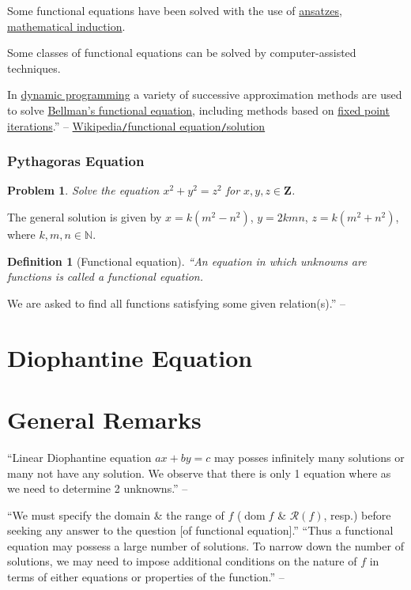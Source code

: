 \documentclass{article}
\numberwithin{equation}{section}
\newtheorem{definition}{Definition}[section]
\newtheorem{problem}{Problem}[section]
\begin{document}
Some functional equations have been solved with the use of \href{https://en.wikipedia.org/wiki/Ansatz}{ansatzes}, \href{https://en.wikipedia.org/wiki/Mathematical_induction}{mathematical induction}.

Some classes of functional equations can be solved by computer-assisted techniques.

In \href{https://en.wikipedia.org/wiki/Dynamic_programming}{dynamic programming} a variety of successive approximation methods are used to solve \href{https://en.wikipedia.org/wiki/Bellman_equation}{Bellman's functional equation}, including methods based on \href{https://en.wikipedia.org/wiki/Fixed_point_iteration}{fixed point iterations}.'' -- \href{https://en.wikipedia.org/wiki/Functional_equation#Solution}{Wikipedia\texttt{/}functional equation\texttt{/}solution}

\subsubsection{Pythagoras Equation}

\begin{problem}
	Solve the equation $x^2 + y^2 = z^2$ for $x,y,z\in\mathbf{Z}$.
\end{problem}
The general solution is given by $x = k(m^2 - n^2)$, $y = 2kmn$, $z = k(m^2 + n^2)$, where $k,m,n\in\mathbb{N}$.

\begin{definition}[Functional equation]
	``An equation in which unknowns are functions is called a \emph{functional equation}.
\end{definition}
We are asked to find all functions satisfying some given relation(s).'' -- \cite[p. 2]{Venkatachala2013}

\section{Diophantine Equation}

\section{General Remarks}
``Linear Diophantine equation $ax + by = c$ may posses infinitely many solutions or many not have any solution. We observe that there is only 1 equation where as we need to determine 2 unknowns.'' -- \cite[p. 1]{Venkatachala2013}

``We must specify the domain \& the range of $f$ ($\operatorname{dom}f$ \& $\mathcal{R}(f)$, resp.) before seeking any answer to the question [of functional equation].'' ``Thus a functional equation may possess a large number of solutions. To narrow down the number of solutions, we may need to impose additional conditions on the nature of $f$ in terms of either equations or properties of the function.'' -- \cite[p. 2]{Venkatachala2013}
\end{document}

